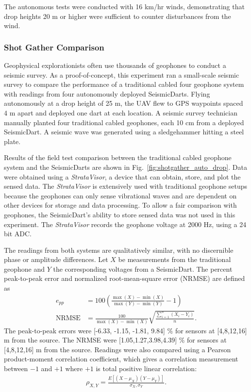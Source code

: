 The autonomous tests were conducted with 16 km/hr winds, demonstrating that drop heights 20 m or higher were sufficient to counter disturbances from the wind.

\subsubsection{Shot Gather Comparison}
Geophysical explorationists often use thousands of geophones to conduct a seismic survey.
As a proof-of-concept, this experiment ran a small-scale seismic survey to compare the performance of a traditional cabled four geophone system with readings from four autonomously deployed SeismicDarts.
Flying autonomously at a drop height of 25 m, the UAV flew to GPS waypoints spaced 4 m apart and deployed one dart at each location.
A seismic survey technician manually planted four traditional cabled geophones, each 10 cm from a deployed SeismicDart.
A seismic wave was generated using a sledgehammer hitting a steel plate.

Results of the field test comparison between the traditional cabled geophone system and the SeismicDarts are shown in Fig.~\ref{fig:shotgather_auto_drop}.
Data were obtained using a \emph{StrataVisor}, a device that can obtain, store, and plot the sensed data.
The \emph{StrataVisor} is extensively used with traditional geophone setups because the geophones can only sense vibrational waves and are dependent on other devices for storage and data processing.
To allow a fair comparison with geophones, the SeismicDart's  ability to store sensed data was not used in this experiment.
The \emph{StrataVisor} records the geophone voltage at 2000 Hz, using a 24 bit ADC.

The readings from both systems are qualitatively similar, with no discernible phase or amplitude differences.
Let $X$ be measurements from the traditional geophone and $Y$ the corresponding voltages from a SeismicDart.
The percent peak-to-peak error and normalized root-mean-square error (NRMSE) are defined as
\begin{align}
e_{pp} &= 100 \left( \frac{ \max(X) - \min(X) }{ \max(Y) - \min(Y) } -1\right) \\
  \text{NRMSE} &=\frac{100}{\max(X) - \min(X)} \sqrt{ \frac{ \sum_{i=1}^n \left( X_i - Y_i \right)}{n} }.
\end{align}
The peak-to-peak errors were [-6.33, -1.15, -1.81,  9.84] \% for sensors at [4,8,12,16] m from the source.
The NRMSE were [1.05,1.27,3.98,4.39] \% for sensors at [4,8,12,16] m from the source.
Readings were also compared using a Pearson product-moment correlation coefficient, which gives a correlation measurement between $-1$ and $+1$ where $+1$ is total positive linear correlation:
\begin{align}
\rho_{X,Y} = \frac{E\left[  (X-\mu_X) (Y-\mu_Y)  \right]}{  \sigma_X, \sigma_Y}.
\end{align}

